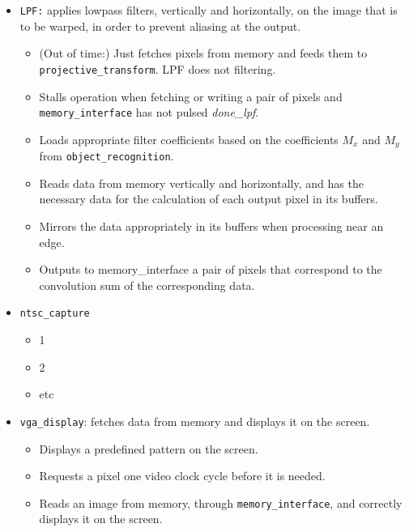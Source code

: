 \documentclass{article}
\begin{document}
\begin{itemize}
\item[] {\tt LPF:} applies lowpass filters, vertically and horizontally, on the image that is to be warped, in order to prevent aliasing at the output.
	\begin{itemize}
	\item (Out of time:) Just fetches pixels from memory and feeds them to {\tt projective\_transform}. LPF does not filtering.
	\item Stalls operation when fetching or writing a pair of pixels and {\tt memory\_interface} has not pulsed {\it done\_lpf}.
	\item Loads appropriate filter coefficients based on the coefficients $M_x$ and $M_y$ from {\tt object\_recognition}.
	\item Reads data from memory vertically and horizontally, and has the necessary data for the calculation of each output pixel in its buffers.
	\item Mirrors the data appropriately in its buffers when processing near an edge.
	\item Outputs to memory\_interface a pair of pixels that correspond to the convolution sum of the corresponding data.
	\end{itemize}

\item[] {\tt ntsc\_capture}
	\begin{itemize}
	\item 1
	\item 2
	\item etc
	\end{itemize}

\item[] {\tt vga\_display}: fetches data from memory and displays it on the screen.
	\begin{itemize}
	\item Displays a predefined pattern on the screen.
	\item Requests a pixel one video clock cycle before it is needed.
	\item Reads an image from memory, through {\tt memory\_interface}, and correctly displays it on the screen.
	\end{itemize}

\end{itemize}
\end{document}
